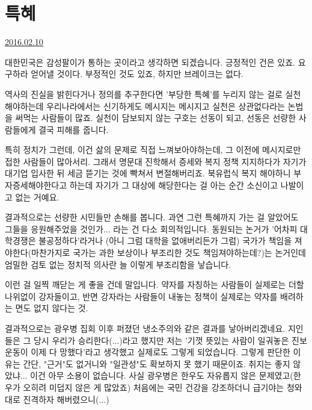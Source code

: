 \section{특혜}
\href{https://www.kockoc.com/Apoc/630168}{2016.02.10}

\vspace{5mm}

대한민국은 감성팔이가 통하는 곳이라고 생각하면 되겠습니다.
긍정적인 건은 있죠. 요구하라 얻어낼 것이다.
부정적인 것도 있죠, 하지만 브레이크는 없다.
\vspace{5mm}

역사의 진실을 밝힌다거나 정의를 추구한다면 '부당한 특혜'를 누리지 않는 걸로 실천해야하는데
우리나라에서는 신기하게도 메시지는 메시지고 실천은 상관없다라는 논법을 써먹는 사람들이 많죠.
실천이 담보되지 않는 구호는 선동이 되고, 선동은 선량한 사람들에게 결국 피해를 줍니다.
\vspace{5mm}

특히 정치가 그런데, 이건 삶의 문제로 직접 느껴보아야하는데, 그 이전에 메시지로만 접한 사람들이 많아서리.
그래서 명문대 진학해서 증세와 복지 정책 지지하다가 자기가 대기업 입사한 뒤 세금 뜯기는 것에 빡쳐서 변절해버리죠.
북유럽식 복지 해야하니 부자증세해야한다고 하는데 자기가 그 대상에 해당한다는 걸 아는 순간 소신이고 나발이고 없는 거예요.
\vspace{5mm}

결과적으로는 선량한 시민들만 손해를 봅니다.
과연 그런 특혜까지 가는 걸 알았어도 그들을 응원해주었을 것인가... 라는 건 다소 회의적입니다.
동원되는 논거가 '어차피 대학경쟁은 불공정하다'라거나 (아니 그럼 대학을 없애버리든가 그럼)
국가가 책임을 져야한다(마찬가지로 국가는 과한 보상이나 부조리한 것도 책임져야하는데?)는 논거인데
엄밀한 검토 없는 정치적 의사란 늘 이렇게 부조리함을 낳습니다.
\vspace{5mm}

이런 걸 일찍 깨닫는 게 좋을 건데 말입니다.
약자를 자칭하는 사람들이 실제로는 더할나위없이 강자들이고,
반면 강자라는 사람들이 내놓는 정책이 실제로는 약자를 배려하는 면도 없지 않다는 것.
\vspace{5mm}

결과적으로는 광우병 집회 이후 퍼졌던 냉소주의와 같은 결과를 낳아버리겠네요.
지인들은 그 당시 우리가 승리한다(...)라고 했지만 저는 '기껏 뜻있는 사람이 일궈놓은 진보운동이 이제 다 망했다'라고 생각했고
실제로도 그렇게 되었습니다. 그렇게 판단한 이유는 간단, "근거"도 없거니와 "일관성"도 확보하지 못 했기 때문이죠.
취지는 좋지 않았냐... 이건 아무 소용이 없습니다. 사실 광우병은 한우도 자유롭지 않은 문제였고(한우가 오히려 미덥지 않은 게 많았죠)
처음에는 국민 건강을 강조하더니 급기야는 청와대로 진격하자 해버렸으니(...)
\vspace{5mm}

